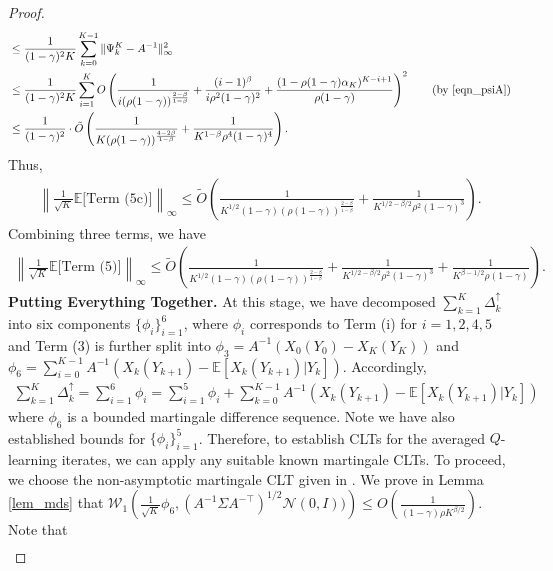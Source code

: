 \documentclass{opt2025} %
\begin{document}
\begin{proof}
\begin{align*}
&\leq \frac{1}{(1-\gamma)^2K} \sum_{k=0}^{K-1} \|\Psi_k^K- A^{-1} \|^2_{\infty}\\
&\leq \frac{1}{(1-\gamma)^2K} \sum_{i=1}^K O\left( \frac{1}{i(\rho(1-\gamma))^{\frac{2-\beta}{1-\beta}}}  + \frac{(i-1)^{\beta}}{i\rho^2(1-\gamma)^2} + \frac{(1-\rho(1-\gamma)\alpha_K)^{K-i+1}}{\rho(1-\gamma)}  \right)^2 \tag{by \cref{eqn_psiA}}\\
&\leq \frac{1}{(1-\gamma)^2} \cdot \tilde{O}\left( \frac{1}{K(\rho(1-\gamma))^{\frac{4-2\beta}{1-\beta}}} + \frac{1}{K^{1-\beta}\rho^4(1-\gamma)^4} \right).
\end{align*}
Thus,
\begin{align*}
\left\| \frac{1}{\sqrt{K}} \mathbb{E}[\text{Term (5c)]} \right\|_{\infty} \leq \tilde{O}\left( \frac{1}{{K}^{1/2}(1-\gamma)(\rho(1-\gamma))^{\frac{2-\beta}{1-\beta}}} + \frac{1}{K^{1/2-\beta/2}\rho^2(1-\gamma)^3} \right).
\end{align*}
Combining three terms, we have
\begin{align*}
\left\| \frac{1}{\sqrt{K}} \mathbb{E}[\text{Term (5)]} \right\|_{\infty} \leq \tilde{O}\left( \frac{1}{{K}^{1/2}(1-\gamma)(\rho(1-\gamma))^{\frac{2-\beta}{1-\beta}}} + \frac{1}{K^{1/2-\beta/2}\rho^2(1-\gamma)^3} + \frac{1}{K^{\beta-1/2}\rho(1-\gamma)} \right).
\end{align*}
\textbf{Putting Everything Together.} At this stage, we have decomposed $\sum_{k=1}^K\Delta^{\uparrow}_{k}$ into six components $\{\phi_i \}_{i=1}^6$, where $\phi_i$ corresponds to Term (i) for $i=1,2,4,5$ and Term (3) is further split into $\phi_3 = A^{-1} (X_0(Y_{0}) - X_K(Y_{K})) $ and $\phi_6=  \sum_{i=0}^{K-1} A^{-1}(X_k(Y_{k+1}) - \mathbb{E}[X_k(Y_{k+1})| Y_{k}])$. Accordingly,
\begin{align}
\sum_{k=1}^K\Delta^{\uparrow}_{k} = \sum_{i=1}^6 \phi_i = \sum_{i=1}^5 \phi_i + \sum_{k=0}^{K-1} A^{-1}(X_k(Y_{k+1}) - \mathbb{E}[X_k(Y_{k+1})| Y_{k}]) \label{eqn_decompose}
\end{align}
where $\phi_6$ is a bounded martingale difference sequence.
Note we have also established bounds for $\{\phi_i \}_{i=1}^5$. Therefore, to establish CLTs for the averaged $Q$-learning iterates, we can apply any suitable known martingale CLTs. To proceed, we choose the non-asymptotic martingale CLT given in \citet{srikant2024rates}. We prove in Lemma \ref{lem_mds} that $\mathcal{W}_1\left( \frac{1}{\sqrt{K}} \phi_6,  (A^{-1}\Sigma A^{-\top})^{1/2}\mathcal{N}(0,I)) \right) \leq O\left( \frac{1}{(1-\gamma)\rho K^{\beta/2}} \right)$. Note that 
\begin{align*}

\end{align*}
\end{proof}
\end{document}

